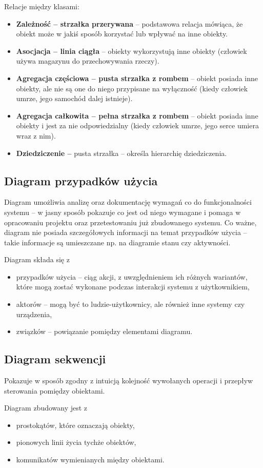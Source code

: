 Relacje między klasami:
\begin{itemize}
	\item{\textbf{Zależność -- strzałka przerywana} -- podstawowa relacja mówiąca, że obiekt może w jakiś sposób korzystać lub wpływać na inne obiekty.}
	\item{\textbf{Asocjacja -- linia ciągła} -- obiekty wykorzystują inne obiekty (człowiek używa magazynu do przechowywania rzeczy).}
	\item{\textbf{Agregacja częściowa -- pusta strzałka z rombem} -- obiekt posiada inne obiekty, ale nie są one do niego przypisane na wyłączność (kiedy człowiek umrze, jego samochód dalej istnieje).}
	\item{\textbf{Agregacja całkowita -- pełna strzałka z rombem} -- obiekt posiada inne obiekty i jest za nie odpowiedzialny (kiedy człowiek umrze, jego serce umiera wraz z nim).}
	\item{\textbf{Dziedziczenie --} pusta strzałka -- określa hierarchię dziedziczenia.}
\end{itemize}
\subsection{Diagram przypadków użycia}
Diagram umożliwia analizę oraz dokumentację wymagań co do funkcjonalności systemu -- w jasny sposób pokazuje co jest od niego wymagane i pomaga w opracowaniu projektu oraz przetestowaniu już zbudowanego systemu. Co ważne, diagram nie posiada szczegółowych informacji na temat przypadków użycia -- takie informacje są umieszczane np. na diagramie stanu czy aktywności.

Diagram składa się z
\begin{itemize}
	\item{przypadków użycia -- ciąg akcji, z uwzględnieniem ich różnych wariantów, które mogą zostać wykonane podczas interakcji systemu z użytkownikiem,}
	\item{aktorów -- mogą być to ludzie-użytkownicy, ale również inne systemy czy urządzenia,}
	\item{związków -- powiązanie pomiędzy elementami diagramu.}
\end{itemize}
\subsection{Diagram sekwencji}
Pokazuje w sposób zgodny z intuicją kolejność wywołanych operacji i przepływ sterowania pomiędzy obiektami.

Diagram zbudowany jest z
\begin{itemize}
	\item{prostokątów, które oznaczają obiekty,}
	\item{pionowych linii życia tychże obiektów,}
	\item{komunikatów wymienianych między obiektami.}
\end{itemize}

